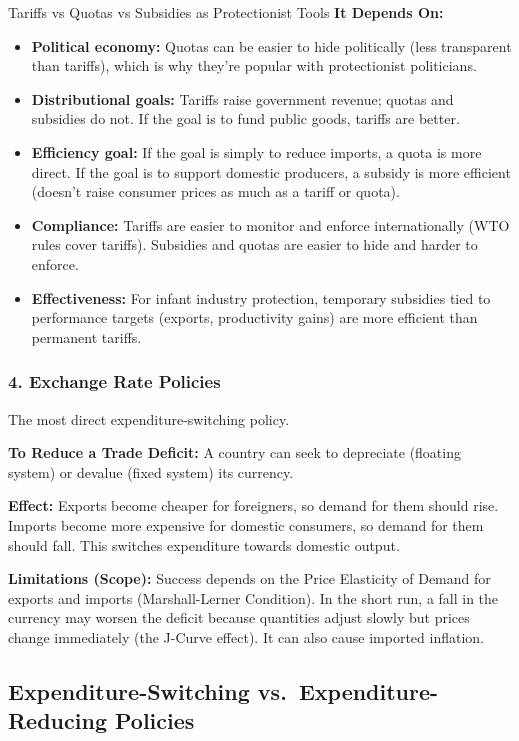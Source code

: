 \documentclass[11pt, a4paper, twoside]{book}
\begin{document}
\begin{evaluation}{Tariffs vs Quotas vs Subsidies as Protectionist Tools}
\textbf{It Depends On:}
\begin{itemize}
  \item \textbf{Political economy:} Quotas can be easier to hide politically (less transparent than tariffs), which is why they're popular with protectionist politicians.
  \item \textbf{Distributional goals:} Tariffs raise government revenue; quotas and subsidies do not. If the goal is to fund public goods, tariffs are better.
  \item \textbf{Efficiency goal:} If the goal is simply to reduce imports, a quota is more direct. If the goal is to support domestic producers, a subsidy is more efficient (doesn't raise consumer prices as much as a tariff or quota).
  \item \textbf{Compliance:} Tariffs are easier to monitor and enforce internationally (WTO rules cover tariffs). Subsidies and quotas are easier to hide and harder to enforce.
  \item \textbf{Effectiveness:} For infant industry protection, temporary subsidies tied to performance targets (exports, productivity gains) are more efficient than permanent tariffs.
\end{itemize}
\end{evaluation}

\subsubsection{4. Exchange Rate Policies}

The most direct expenditure-switching policy.

\textbf{To Reduce a Trade Deficit:} A country can seek to depreciate (floating system) or devalue (fixed system) its currency.

\textbf{Effect:} Exports become cheaper for foreigners, so demand for them should rise. Imports become more expensive for domestic consumers, so demand for them should fall. This switches expenditure towards domestic output.

\textbf{Limitations (Scope):} Success depends on the Price Elasticity of Demand for exports and imports (Marshall-Lerner Condition). In the short run, a fall in the currency may worsen the deficit because quantities adjust slowly but prices change immediately (the J-Curve effect). It can also cause imported inflation.

\subsection{Expenditure-Switching vs.\ Expenditure-Reducing Policies}
\end{document}
